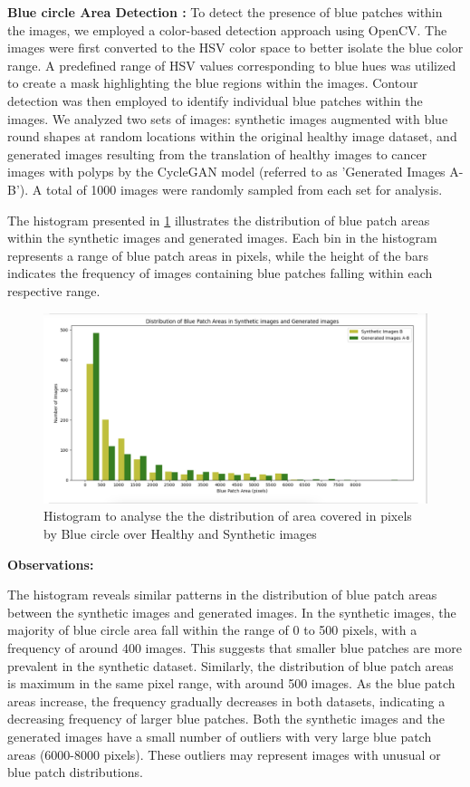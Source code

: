 \documentclass[UKenglish,12pt]{master-style}
\begin{document}
\textbf{Blue circle Area Detection :}
To detect the presence of blue patches within the images, we employed a color-based detection approach using OpenCV. The images were first converted to the HSV color space to better isolate the blue color range. A predefined range of HSV values corresponding to blue hues was utilized to create a mask highlighting the blue regions within the images. Contour detection was then employed to identify individual blue patches within the images. We analyzed two sets of images: synthetic images augmented with blue round shapes at random locations within the original healthy image dataset, and generated images resulting from the translation of healthy images to cancer images with polyps by the CycleGAN model (referred to as 'Generated Images A-B'). A total of 1000 images were randomly sampled from each set for analysis.

The histogram presented in \ref{fig:Blue_circle_area} illustrates the distribution of blue patch areas within the synthetic images and generated images. Each bin in the histogram represents a range of blue patch areas in pixels, while the height of the bars indicates the frequency of images containing blue patches falling within each respective range.

\begin{figure}[htbp]
    \centering
    \includegraphics[width=1\textwidth]{Images/Blue_circle_area.png}
    \caption{Histogram to analyse the the distribution of area covered in pixels by Blue circle over Healthy and Synthetic images}
    \label{fig:Blue_circle_area}
\end{figure}

\textbf{Observations:}

The histogram reveals similar patterns in the distribution of blue patch areas between the synthetic images and generated images.
In the synthetic images, the majority of blue circle area fall within the range of 0 to 500 pixels, with a frequency of around 400 images. This suggests that smaller blue patches are more prevalent in the synthetic dataset. Similarly, the distribution of blue patch areas is maximum in the same pixel range, with around 500 images.
As the blue patch areas increase, the frequency gradually decreases in both datasets, indicating a decreasing frequency of larger blue patches. Both the synthetic images and the generated images have a small number of outliers with very large blue patch areas (6000-8000 pixels). These outliers may represent images with unusual or blue patch distributions.
\end{document}
